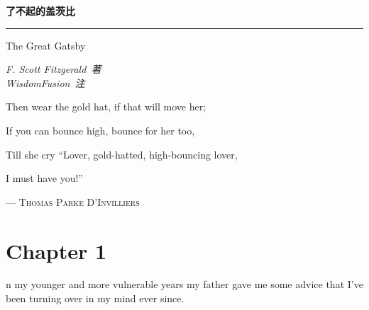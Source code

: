 \documentclass{znotebook}
\begin{document}
\begin{titlepage}
  \vspace*{25ex}
  
  \hspace{0.05\textwidth}\begin{minipage}{.9\textwidth}
    \flushright
    
    {\textbf{了不起的盖茨比}}
    
    \rule{\linewidth}{.5pt}
    
    \vspace{2ex}
    
    {\textsf{The Great Gatsby}} \\
    
    \vspace{20ex}
    
    {\textit{F. Scott Fitzgerald~著 \\ WisdomFusion~注}}
  \end{minipage}
\end{titlepage}
\thispagestyle{empty}


\frontmatter


\clearpage
{
  \hypersetup{hidelinks}
  \tableofcontents
}

\cleardoublepage
\thispagestyle{empty}


\vspace*{.3\textheight}
\hspace{.1\textwidth}\begin{minipage}{.7\textwidth}
  \large
  
  Then wear the gold hat, if that will move her;
  
  If you can bounce high, bounce for her too,
  
  Till she cry ``Lover, gold-hatted, high-bouncing lover,
  
  I must have you!''
  
  \flushright
  --- \textsc{Thomas Parke D'Invilliers}
\end{minipage}



\mainmatter


\chapter{Chapter 1}

\lettrine[findent=2pt]{}{ }n my younger and more vulnerable years my father gave me some advice that I've been turning over in my mind ever since.
\end{document}
